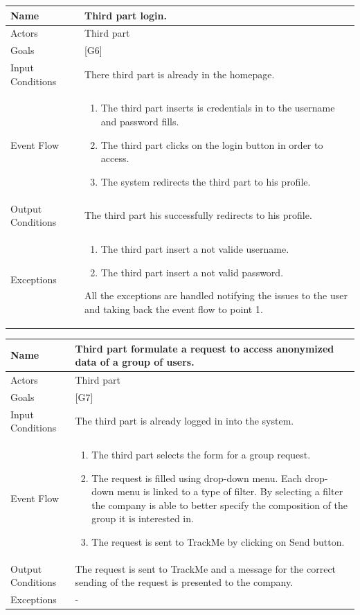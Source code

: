 \documentclass{article}
\begin{document}
\begin{center}
    \begin{tabular}{ | l | p{10cm} |}
    \hline
    Name & Third part login.\\ \hline
    Actors & Third part\\ \hline
   	Goals & {[G6]}\\ \hline
    Input Conditions & There third part is already in the homepage.\\ \hline
    Event Flow & \begin{enumerate}
    	\item The third part inserts is credentials in to the username and password fills.
		\item The third part clicks on the login button in order to access.
		\item The system redirects the third part to his profile.
    \end{enumerate} \\ \hline
    Output Conditions & The third part his successfully redirects to his profile.  \\ \hline
    Exceptions & \begin{enumerate}
   \item The third part insert a not valide username.
	\item The third part insert a not valid password.
\end{enumerate} All the exceptions are handled notifying the issues to the user and taking back the event flow to point 1.    \\ \hline
    \end{tabular}
\end{center}

\begin{center}
    \begin{tabular}{ | l | p{10cm} |}
    \hline
    Name & Third part formulate a request to access anonymized data of a group of users.\\ \hline
    Actors & Third part\\ \hline
   	Goals & {[G7]}\\ \hline
    Input Conditions & The third part is already logged in into the system.\\ \hline
    Event Flow & \begin{enumerate}
    	\item The third part selects the form for a group request.
    	\item The request is filled using drop-down menu. Each drop-down menu is linked to a type of filter. By selecting a filter the company is able to better specify the composition of the group it is interested in.
		\item The request is sent to TrackMe by clicking on Send button. 
    \end{enumerate} \\ \hline
    Output Conditions & The request is sent to TrackMe and a message for the correct sending of the request is presented to the company. \\ \hline
    Exceptions & -   \\ \hline
    \end{tabular}
\end{center}
\end{document}
